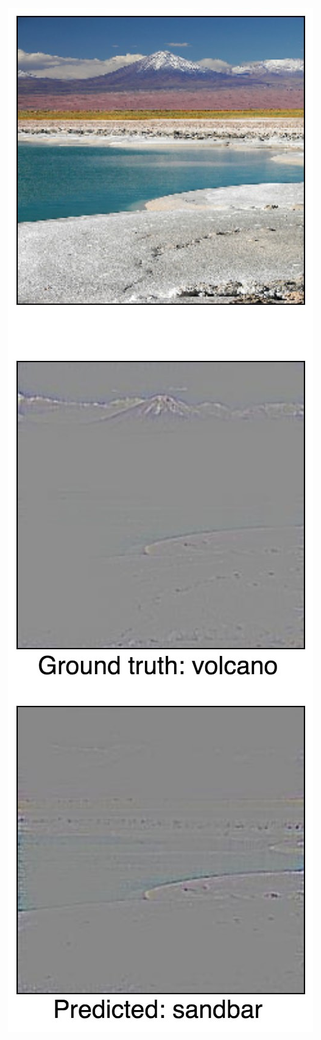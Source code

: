 \begin{figure}[ht!]
    \begin{center}
    \begin{subfigure}[b]{0.23\linewidth}
        \centering
        \includegraphics[width=1\linewidth]{figures/failure_62.jpg}

\end{subfigure}
\end{center}
\end{figure}
